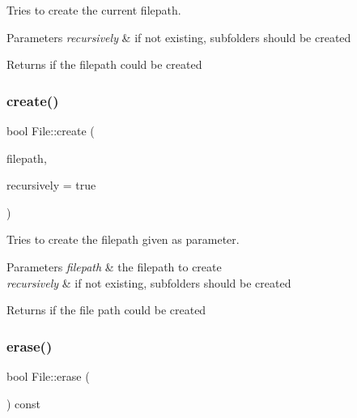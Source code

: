 Tries to create the current filepath. 


\begin{DoxyParams}{Parameters}
{\em recursively} & if not existing, subfolders should be created \\
\hline
\end{DoxyParams}
\begin{DoxyReturn}{Returns}
if the filepath could be created 
\end{DoxyReturn}
\mbox{\label{class_file_a255061b2a5ed2db1c9f8fce9ab78af4e}} 
\subsubsection{\texorpdfstring{create()}{create()}\hspace{0.1cm}{\footnotesize\ttfamily [2/2]}}
{\footnotesize\ttfamily bool File\+::create (\begin{DoxyParamCaption}\item[{const \mbox{\hyperlink{class_a_string}{A\+String}} \&}]{filepath,  }\item[{bool}]{recursively = {\ttfamily true} }\end{DoxyParamCaption})\hspace{0.3cm}{\ttfamily [static]}}



Tries to create the filepath given as parameter. 


\begin{DoxyParams}{Parameters}
{\em filepath} & the filepath to create \\
\hline
{\em recursively} & if not existing, subfolders should be created \\
\hline
\end{DoxyParams}
\begin{DoxyReturn}{Returns}
if the file path could be created 
\end{DoxyReturn}
\mbox{\label{class_file_ad1eb2efb9d067dded30d4ef54eb307d1}} 
\subsubsection{\texorpdfstring{erase()}{erase()}\hspace{0.1cm}{\footnotesize\ttfamily [1/2]}}
{\footnotesize\ttfamily bool File\+::erase (\begin{DoxyParamCaption}{ }\end{DoxyParamCaption}) const}



